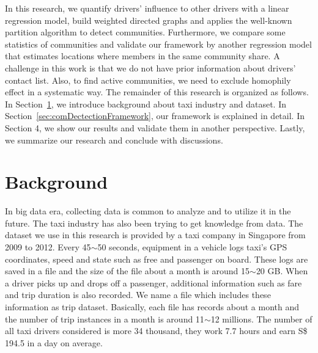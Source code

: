\documentclass{article}
\begin{document}
In this research, we quantify drivers' influence to other drivers with a linear regression model, build weighted directed graphs and applies the well-known partition algorithm to detect communities. Furthermore, we compare some statistics of communities and validate our framework by another regression model that estimates locations where members in the same community share. A challenge in this work is that we do not have prior information about drivers' contact list. Also, to find active communities, we need to exclude homophily effect in a systematic way. The remainder of this research is organized as follows. In Section~\ref{sec:background}, we introduce background about taxi industry and dataset. In Section~\ref{sec:comDectectionFramework}, our framework is explained in detail. In Section 4, we show our results and validate them in another perspective. Lastly, we summarize our research and conclude with discussions.


\section{Background} \label{sec:background}

In big data era, collecting data is common to analyze and to utilize it in the future. The taxi industry has also been trying to get knowledge from data. The dataset we use in this research is provided by a taxi company in Singapore from 2009 to 2012. Every 45$\sim$50 seconds, equipment in a vehicle logs taxi's GPS coordinates, speed and state such as free and passenger on board. These logs are saved in a file and the size of the file about a month is around 15$\sim$20 GB. When a driver picks up and drops off a passenger, additional information such as fare and trip duration is also recorded. We name a file which includes these information as trip dataset. Basically, each file has records about a month and the number of trip instances in a month is around 11$\sim$12 millions. The number of all taxi drivers considered is more 34 thousand, they work 7.7 hours and earn S\$ 194.5 in a day on average.
\end{document}
